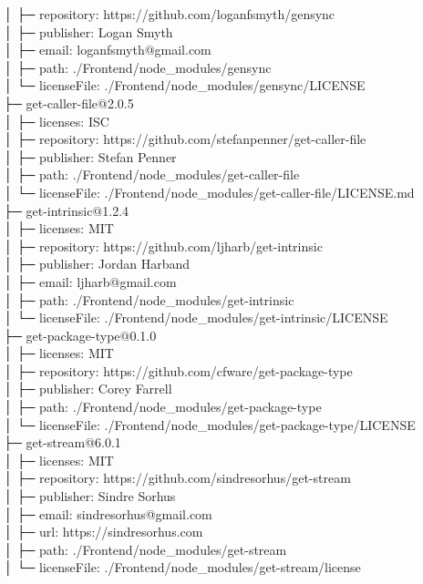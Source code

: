 │  ├─ repository: https://github.com/loganfsmyth/gensync\\
│  ├─ publisher: Logan Smyth\\
│  ├─ email: loganfsmyth@gmail.com\\
│  ├─ path: ./Frontend/node\_modules/gensync\\
│  └─ licenseFile: ./Frontend/node\_modules/gensync/LICENSE\\
├─ get-caller-file@2.0.5\\
│  ├─ licenses: ISC\\
│  ├─ repository: https://github.com/stefanpenner/get-caller-file\\
│  ├─ publisher: Stefan Penner\\
│  ├─ path: ./Frontend/node\_modules/get-caller-file\\
│  └─ licenseFile: ./Frontend/node\_modules/get-caller-file/LICENSE.md\\
├─ get-intrinsic@1.2.4\\
│  ├─ licenses: MIT\\
│  ├─ repository: https://github.com/ljharb/get-intrinsic\\
│  ├─ publisher: Jordan Harband\\
│  ├─ email: ljharb@gmail.com\\
│  ├─ path: ./Frontend/node\_modules/get-intrinsic\\
│  └─ licenseFile: ./Frontend/node\_modules/get-intrinsic/LICENSE\\
├─ get-package-type@0.1.0\\
│  ├─ licenses: MIT\\
│  ├─ repository: https://github.com/cfware/get-package-type\\
│  ├─ publisher: Corey Farrell\\
│  ├─ path: ./Frontend/node\_modules/get-package-type\\
│  └─ licenseFile: ./Frontend/node\_modules/get-package-type/LICENSE\\
├─ get-stream@6.0.1\\
│  ├─ licenses: MIT\\
│  ├─ repository: https://github.com/sindresorhus/get-stream\\
│  ├─ publisher: Sindre Sorhus\\
│  ├─ email: sindresorhus@gmail.com\\
│  ├─ url: https://sindresorhus.com\\
│  ├─ path: ./Frontend/node\_modules/get-stream\\
│  └─ licenseFile: ./Frontend/node\_modules/get-stream/license\\
